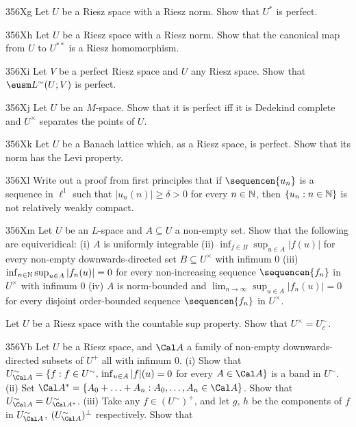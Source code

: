 {\spheader 356Xg Let $U$ be a Riesz space with a Riesz norm.   Show that
$U^*$ is perfect.

\spheader 356Xh  Let $U$ be a Riesz space with a Riesz norm.   Show that
the canonical map from $U$ to $U^{**}$ is a Riesz homomorphism.

\spheader 356Xi Let $V$ be a perfect Riesz space and $U$ any Riesz
space.   Show that $\eusm L^{\sim}(U;V)$ is perfect.   

\spheader 356Xj Let $U$ be an $M$-space.   Show that it is perfect iff
it is Dedekind complete and $U^{\times}$ separates the points of $U$.

\spheader 356Xk Let $U$ be a Banach lattice which, as a Riesz space, is
perfect.   Show that its norm has the Levi property.

\spheader 356Xl Write out a proof from first principles that if
$\sequencen{u_n}$ is a sequence in $\ell^1$ such that
$|u_n(n)|\ge\delta>0$ for every $n\in\Bbb N$, then $\{u_n:n\in\Bbb N\}$
is not relatively weakly compact.

\spheader 356Xm Let $U$ be an $L$-space and $A\subseteq U$ a non-empty
set.   Show that the following are equiveridical:  (i) $A$ is uniformly
integrable (ii) $\inf_{f\in B}\sup_{u\in A}|f(u)|$ for every non-empty
downwards-directed set $B\subseteq U^{\times}$ with infimum $0$ (iii)
$\inf_{n\in\Bbb N}\sup_{u\in A}|f_n(u)|=0$ for every non-increasing
sequence $\sequencen{f_n}$ in $U^{\times}$ with infimum $0$ (iv) $A$ is
norm-bounded and $\lim_{n\to\infty}\sup_{u\in A}|f_n(u)|=0$ for every
disjoint order-bounded sequence $\sequencen{f_n}$ in $U^{\times}$.

Let $U$ be a Riesz space with the countable sup
property.   Show that $U^{\times}=U^{\sim}_c$.

\spheader 356Yb Let $U$ be a Riesz space, and $\Cal A$ a family of
non-empty downwards-directed subsets of $U^+$ all with infimum $0$.
(i) Show that $U^{\sim}_{\Cal A}=\{f:f\in U^{\sim},\,\inf_{u\in
A}|f|(u)=0$ for every $A\in\Cal A\}$ is a band in $U^{\sim}$.   (ii) Set
$\Cal A^*=\{A_0+\ldots+A_n:A_0,\ldots,A_n\in\Cal A\}$.   Show that
$U^{\sim}_{\Cal A}=U^{\sim}_{\Cal A^*}$.    (iii) Take any
$f\in(U^{\sim})^+$, and let $g$, $h$ be the components of $f$ in
$U^{\sim}_{\Cal A}$, $(U^{\sim}_{\Cal A})^{\perp}$ respectively.   Show
that

}

